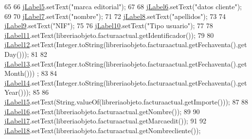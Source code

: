 \begin{DoxyCode}
65 
66         \mbox{\hyperlink{class_interfaz_package_1_1_interfaz_consulta_factura_a375c733d68f59477fc27bdeb6ea2dae9}{jLabel5}}.setText(\textcolor{stringliteral}{"marca editorial"});
67 
68         \mbox{\hyperlink{class_interfaz_package_1_1_interfaz_consulta_factura_a0769a03c29fa86b156dbb861f170e3cf}{jLabel6}}.setText(\textcolor{stringliteral}{"datos cliente"});
69 
70         \mbox{\hyperlink{class_interfaz_package_1_1_interfaz_consulta_factura_a590afc655fceef038e603a5471cf720e}{jLabel7}}.setText(\textcolor{stringliteral}{"nombre"});
71 
72         \mbox{\hyperlink{class_interfaz_package_1_1_interfaz_consulta_factura_af48914b9b888e1bf5f30c0ffc0886c8f}{jLabel8}}.setText(\textcolor{stringliteral}{"apellidos"});
73 
74         \mbox{\hyperlink{class_interfaz_package_1_1_interfaz_consulta_factura_a1d3ecb3e98c0cd65e46d2c18f1aa1aef}{jLabel9}}.setText(\textcolor{stringliteral}{"NIF"});
75 
76         \mbox{\hyperlink{class_interfaz_package_1_1_interfaz_consulta_factura_a0461634349aa909bfae6f71cde48237e}{jLabel10}}.setText(\textcolor{stringliteral}{"Tipo usuario"});
77 
78         \mbox{\hyperlink{class_interfaz_package_1_1_interfaz_consulta_factura_a1919b598f93c83b94462145aac6a0bad}{jLabel11}}.setText(libreriaobjeto.facturaactual.getIdentificador());
79 
80         \mbox{\hyperlink{class_interfaz_package_1_1_interfaz_consulta_factura_ae159c41381ffd7d9927b558e61a5deb5}{jLabel12}}.setText(Integer.toString(libreriaobjeto.facturaactual.getFechaventa().getDay()));
81 
82         \mbox{\hyperlink{class_interfaz_package_1_1_interfaz_consulta_factura_a57b866843fb85f8fa14ad3f78bafe6ed}{jLabel13}}.setText(Integer.toString(libreriaobjeto.facturaactual.getFechaventa().getMonth()))
      ;
83 
84         \mbox{\hyperlink{class_interfaz_package_1_1_interfaz_consulta_factura_ac1f0ed85064a9ed6bac8edad397a6c55}{jLabel14}}.setText(Integer.toString(libreriaobjeto.facturaactual.getFechaventa().getYear()));
85 
86         \mbox{\hyperlink{class_interfaz_package_1_1_interfaz_consulta_factura_afb0f847d7f072d789f7dce6ef6fb2189}{jLabel15}}.setText(String.valueOf(libreriaobjeto.facturaactual.getImporte()));
87 
88         \mbox{\hyperlink{class_interfaz_package_1_1_interfaz_consulta_factura_a587aaa1d1e0e2ca30b4d2200fd1728e4}{jLabel16}}.setText(libreriaobjeto.facturaactual.getNombre());
89 
90         \mbox{\hyperlink{class_interfaz_package_1_1_interfaz_consulta_factura_a041b6262d6b6883bcbc9ffed38bcdcdd}{jLabel17}}.setText(libreriaobjeto.facturaactual.getMarcaedit());
91 
92         \mbox{\hyperlink{class_interfaz_package_1_1_interfaz_consulta_factura_a352b4e6a3aa39375f57c78e2740b4cd9}{jLabel18}}.setText(libreriaobjeto.facturaactual.getNombrecliente());

\end{DoxyCode}
